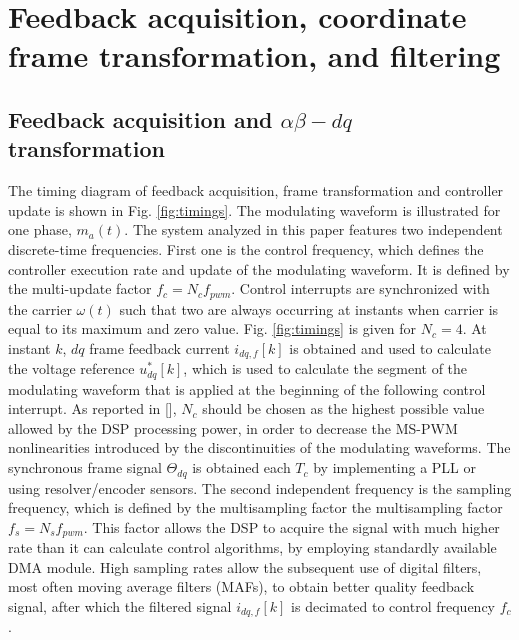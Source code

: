 \documentclass[journal]{IEEEtran}
\begin{document}
\section{Feedback acquisition, coordinate frame transformation, and filtering}

\subsection{Feedback acquisition and $\alpha \beta - dq$ transformation}

The timing diagram of feedback acquisition, frame transformation and controller update is shown in Fig. \ref{fig:timings}. The modulating waveform is illustrated for one phase, $m_a(t)$.
The system analyzed in this paper features two independent discrete-time frequencies. First one is the control frequency, which defines the controller execution rate and update of the modulating waveform. It is defined by the multi-update factor $f_c = N_c f_{pwm}$. Control interrupts are synchronized with the carrier $\omega(t)$ such that two are always occurring at instants when carrier is equal to its maximum and zero value. Fig. \ref{fig:timings} is given for $N_c = 4$. At instant $k$, $dq$ frame feedback current $i_{dq,f}[k]$ is obtained and used to calculate the voltage reference $u^*_{dq}[k]$, which is used to calculate the segment of the modulating waveform that is applied at the beginning of the following control interrupt. As reported in [], $N_c$ should be chosen as the highest possible value allowed by the DSP processing power, in order to decrease the MS-PWM nonlinearities introduced by the discontinuities of the modulating waveforms. The synchronous frame signal $\Theta_{dq}$ is obtained each $T_c$ by implementing a PLL or using resolver/encoder sensors. 
The second independent frequency is the sampling frequency, which is defined by the multisampling factor the multisampling factor $f_s = N_s f_{pwm}$. This factor allows the DSP to acquire the signal with much higher rate than it can calculate control algorithms, by employing standardly available DMA module. High sampling rates allow the subsequent use of digital filters, most often moving average filters (MAFs), to obtain better quality feedback signal, after which the filtered signal $i_{dq,f}[k]$ is decimated to control frequency $f_c$. 
\end{document}
